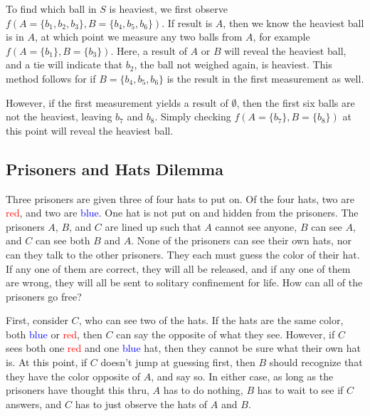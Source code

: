 \documentclass[12pt]{article}
\begin{document}
	To find which ball in $S$ is heaviest, we first observe $f(A = \{b_1, b_2, b_3\}, B = \{b_4, b_5, b_6\})$. If result is $A$, then we know the heaviest ball is in $A$, at which point we measure any two balls from $A$, for example $f(A = \{b_1\}, B = \{b_3\})$. Here, a result of $A$ or $B$ will reveal the heaviest ball, and a tie will indicate that $b_2$, the ball not weighed again, is heaviest. This method follows for if $B = \{b_4, b_5, b_6\}$ is the result in the first measurement as well. \linebreak

	However, if the first measurement yields a result of $\emptyset$, then the first six balls are not the heaviest, leaving $b_7$ and $b_8$. Simply checking $f(A = \{b_7\}, B = \{b_8\})$ at this point will reveal the heaviest ball.

	\subsection{Prisoners and Hats Dilemma}
	Three prisoners are given three of four hats to put on. Of the four hats, two are \textcolor{red}{red}, and two are \textcolor{blue}{blue}. One hat is not put on and hidden from the prisoners. The prisoners $A$, $B$, and $C$ are lined up such that $A$ cannot see anyone, $B$ can see $A$, and $C$ can see both $B$ and $A$. None of the prisoners can see their own hats, nor can they talk to the other prisoners. They each must guess the color of their hat. If any one of them are correct, they will all be released, and if any one of them are wrong, they will all be sent to solitary confinement for life. How can all of the prisoners go free? \linebreak

	First, consider $C$, who can see two of the hats. If the hats are the same color, both \textcolor{blue}{blue} or \textcolor{red}{red}, then $C$ can say the opposite of what they see. However, if $C$ sees both one \textcolor{red}{red} and one \textcolor{blue}{blue} hat, then they cannot be sure what their own hat is. At this point, if $C$ doesn't jump at guessing first, then $B$ should recognize that they have the color opposite of $A$, and say so. In either case, as long as the prisoners have thought this thru, $A$ has to do nothing, $B$ has to wait to see if $C$ answers, and $C$ has to just observe the hats of $A$ and $B$.
\end{document}
